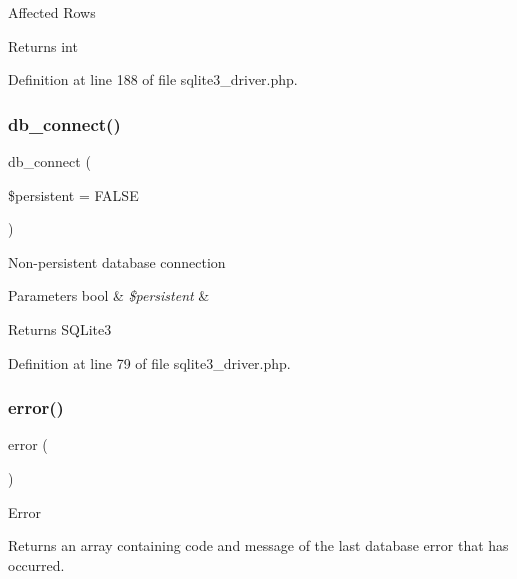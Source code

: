 Affected Rows

\begin{DoxyReturn}{Returns}
int 
\end{DoxyReturn}


Definition at line 188 of file sqlite3\+\_\+driver.\+php.

\mbox{\label{class_c_i___d_b__sqlite3__driver_a52bf595e79e96cc0a7c907a9b45aeb4d}} 
\subsubsection{\texorpdfstring{db\_connect()}{db\_connect()}}
{\footnotesize\ttfamily db\+\_\+connect (\begin{DoxyParamCaption}\item[{}]{\$persistent = {\ttfamily FALSE} }\end{DoxyParamCaption})}

Non-\/persistent database connection


\begin{DoxyParams}[1]{Parameters}
bool & {\em \$persistent} & \\
\hline
\end{DoxyParams}
\begin{DoxyReturn}{Returns}
S\+Q\+Lite3 
\end{DoxyReturn}


Definition at line 79 of file sqlite3\+\_\+driver.\+php.

\mbox{\label{class_c_i___d_b__sqlite3__driver_a43b8d30b879d4f09ceb059b02af2bc02}} 
\subsubsection{\texorpdfstring{error()}{error()}}
{\footnotesize\ttfamily error (\begin{DoxyParamCaption}{ }\end{DoxyParamCaption})}

Error

Returns an array containing code and message of the last database error that has occurred.

